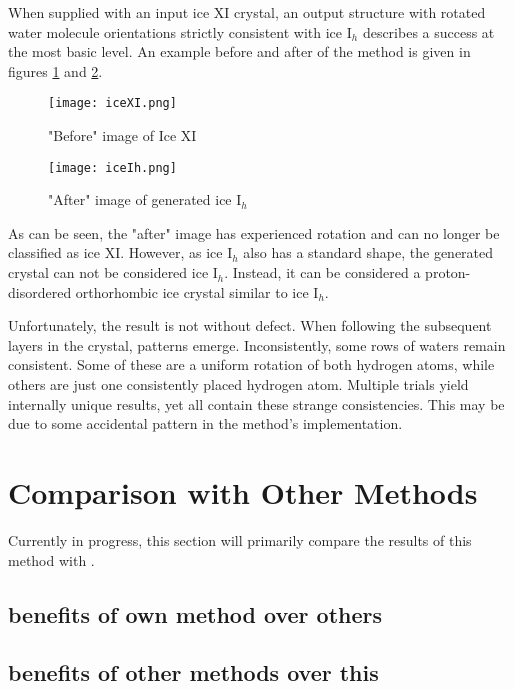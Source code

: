 When supplied with an input ice XI crystal, an output structure with rotated water molecule orientations strictly consistent with ice I$_{h}$ describes a success at the most basic level.
An example before and after of the method is given in figures \ref{fig:iceXI} and \ref{fig:iceIh}.
\begin{figure}
	
	\centering
	
	\texttt{[image: iceXI.png]}
	
	\caption{"Before" image of Ice XI}
	
	\label{fig:iceXI}
	
\end{figure}
\begin{figure}
	
	\centering
	
	\texttt{[image: iceIh.png]}
	
	\caption{"After" image of generated ice I$_{h}$}
	
	\label{fig:iceIh}
	
\end{figure}
As can be seen, the "after" image has experienced rotation and can no longer be classified as ice XI. 
However, as ice I$_{h}$ also has a standard shape, the generated crystal can not be considered ice I$_{h}$.
Instead, it can be considered a proton-disordered orthorhombic ice crystal similar to ice I$_{h}$. 

Unfortunately, the result is not without defect.
When following the subsequent layers in the crystal, patterns emerge. 
Inconsistently, some rows of waters remain consistent.
Some of these are a uniform rotation of both hydrogen atoms, while others are just one consistently placed hydrogen atom.
Multiple trials yield internally unique results, yet all contain these strange consistencies.
This may be due to some accidental pattern in the method's implementation.

%
%
%
%
\section{Comparison with Other Methods}
Currently in progress, this section will primarily compare the results of this method with \cite{MCIce}.
\subsection{benefits of own method over others}
\subsection{benefits of other methods over this}
%
%
%
%


